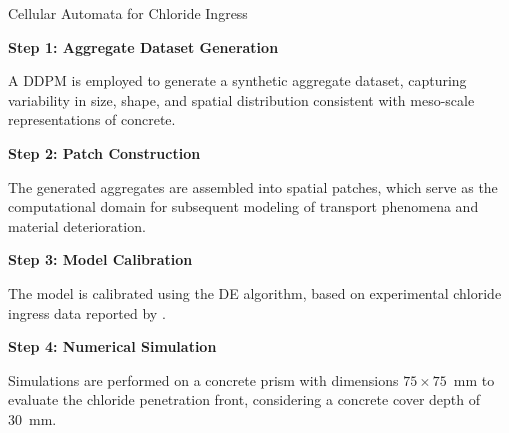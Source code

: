 \begin{frame}{Cellular Automata for Chloride Ingress}

\justifying

\textbf{Step 1: Aggregate Dataset Generation}

A DDPM is employed to generate a synthetic
aggregate dataset, capturing variability in size, shape, and spatial distribution
consistent with meso-scale representations of concrete.

\vspace{0.15cm}

\textbf{Step 2: Patch Construction}

The generated aggregates are assembled into spatial patches, which serve as the
computational domain for subsequent modeling of transport phenomena and material
deterioration.

\vspace{0.15cm}

\textbf{Step 3: Model Calibration}

The model is calibrated using the DE algorithm,
based on experimental chloride ingress data reported by \cite{DU201487}.

\vspace{0.15cm}

\textbf{Step 4: Numerical Simulation}

Simulations are performed on a concrete prism with dimensions
$75 \times 75$~mm to evaluate the chloride penetration front,
considering a concrete cover depth of 30~mm.

\end{frame}
